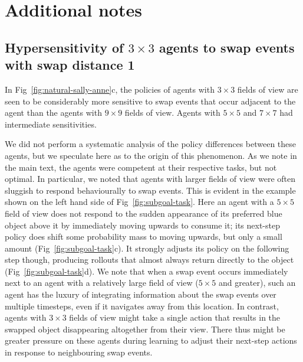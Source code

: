 \documentclass{article}
\begin{document}
\newpage
\section{Additional notes}
\label{appendix:notes}

\subsection{Hypersensitivity of $3 \times 3$ agents to swap events with swap distance 1}
\label{appendix:notes:hypersensitivity}

In Fig~\ref{fig:natural-sally-anne}c, the policies of agents with $3 \times 3$ fields of view are seen to be considerably more sensitive to swap events that occur adjacent to the agent than the agents with $9 \times 9$ fields of view. Agents with $5 \times 5$ and $7 \times 7$ had intermediate sensitivities.

We did not perform a systematic analysis of the policy differences between these agents, but we speculate here as to the origin of this phenomenon. As we note in the main text, the agents were competent at their respective tasks, but not optimal. In particular, we noted that agents with larger fields of view were often sluggish to respond behaviourally to swap events. This is evident in the example shown on the left hand side of Fig~\ref{fig:subgoal-task}. Here an agent with a $5 \times 5$ field of view does not respond to the sudden appearance of its preferred blue object above it by immediately moving upwards to consume it; its next-step policy does shift some probability mass to moving upwards, but only a small amount (Fig~\ref{fig:subgoal-task}c). It strongly adjusts its policy on the following step though, producing rollouts that almost always return directly to the object (Fig~\ref{fig:subgoal-task}d). We note that when a swap event occurs immediately next to an agent with a relatively large field of view ($5 \times 5$ and greater), such an agent has the luxury of integrating information about the swap events over multiple timesteps, even if it navigates away from this location. In contrast, agents with $3 \times 3$ fields of view might take a single action that results in the swapped object disappearing altogether from their view. There thus might be greater pressure on these agents during learning to adjust their next-step actions in response to neighbouring swap events.
\end{document}
